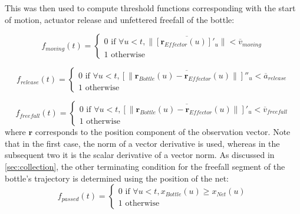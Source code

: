 \documentclass{article}
\begin{document}
This was then used to compute threshold functions corresponding with the start of motion, actuator release and unfettered freefall of the bottle:

\begin{equation}
    f_{moving} (t) = \begin{cases}
        0 \text{ if } \forall u < t,  \lVert \overline{\left [  \mathbf{r}_{Effector}(u) \right ]'_u} \rVert  < \overline{v}_{moving} \\
        1 \text{ otherwise }
    \end{cases}
\end{equation}

\begin{equation}
    f_{release} (t) = \begin{cases}
        0 \text{ if } \forall u < t, \overline{ \left [ \lVert  \mathbf{r}_{Bottle}(u) -  \mathbf{r}_{Effector}(u)  \rVert \right ] ''_u} < \overline{a}_{release} \\
        1 \text{ otherwise }
    \end{cases}
\end{equation}

\begin{equation}
    f_{freefall} (t) = \begin{cases}
        0 \text{ if } \forall u < t,  \overline{ \left [ \lVert  \mathbf{r}_{Bottle}(u) -  \mathbf{r}_{Effector}(u)  \rVert \right ] '_u} < \overline{v}_{freefall} \\
        1 \text{ otherwise }
    \end{cases}
\end{equation}
where $\mathbf{r}$ corresponds to the position component of the observation vector. Note that in the first case, the norm of a vector derivative is used, whereas in the subsequent two it is the scalar derivative of a vector norm. As discussed in \ref{sec:collection}, the other terminating condition for the freefall segment of the bottle's trajectory is determined using the position of the net:
\begin{equation}
    f_{passed} (t) = \begin{cases}
        0 \text{ if } \forall u < t, x_{Bottle}(u) \geq x_{Net}(u) \\
        1 \text{ otherwise }
    \end{cases}
\end{equation}
\end{document}
